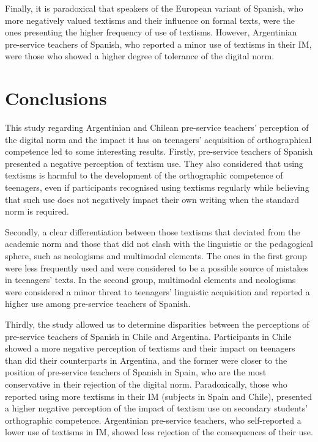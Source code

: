 \documentclass{textolivre}
\begin{document}
Finally, it is paradoxical that speakers of the European variant of Spanish, who more negatively valued textisms and their influence on formal texts, were the ones presenting the higher frequency of use of textisms. However, Argentinian pre-service teachers of Spanish, who reported a minor use of textisms in their IM, were those who showed a higher degree of tolerance of the digital norm. 

\section{Conclusions}
This study regarding Argentinian and Chilean pre-service teachers’ perception of the digital norm and the impact it has on teenagers’ acquisition of orthographical competence led to some interesting results. Firstly, pre-service teachers of Spanish presented a negative perception of textism use. They also considered that using textisms is harmful to the development of the orthographic competence of teenagers, even if participants recognised using textisms regularly while believing that such use does not negatively impact their own writing when the standard norm is required.

Secondly, a clear differentiation between those textisms that deviated from the academic norm and those that did not clash with the linguistic or the pedagogical sphere, such as neologisms and multimodal elements. The ones in the first group were less frequently used and were considered to be a possible source of mistakes in teenagers’ texts. In the second group, multimodal elements and neologisms were considered a minor threat to teenagers’ linguistic acquisition and reported a higher use among pre-service teachers of Spanish.

Thirdly, the study allowed us to determine disparities between the perceptions of pre-service teachers of Spanish in Chile and Argentina. Participants in Chile showed a more negative perception of textisms and their impact on teenagers than did their counterparts in Argentina, and the former were closer to the position of pre-service teachers of Spanish in Spain, who are the most conservative in their rejection of the digital norm. Paradoxically, those who reported using more textisms in their IM (subjects in Spain and Chile), presented a higher negative perception of the impact of textism use on secondary students’ orthographic competence. Argentinian pre-service teachers, who self-reported a lower use of textisms in IM, showed less rejection of the consequences of their use. 
\end{document}
